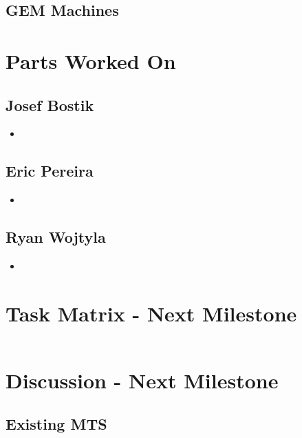 \documentclass[12pt]{article}
\begin{document}
\subsection{GEM Machines}


\section{Parts Worked On}

\subsection{Josef Bostik}

\begin{itemize}
\item 
\end{itemize}

\subsection{Eric Pereira}

\begin{itemize}
\item 
\end{itemize}

\subsection{Ryan Wojtyla}

\begin{itemize}
\item 

\end{itemize}

\section{Task Matrix - Next Milestone}

\begin{center}
  \begin{tabular}{|c|c|c|c|}
  \end{tabular}
\end{center}

\section{Discussion - Next Milestone}

\subsection{Existing MTS}
\end{document}
